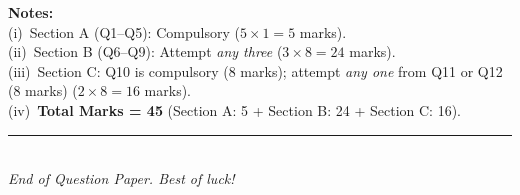 \documentclass[11pt,a4paper]{article}
\begin{document}
\smallskip
\noindent\footnotesize
\textbf{Notes:}\\
(i)~Section A (Q1--Q5): Compulsory ($5 \times 1 = 5$ marks).\\
(ii)~Section B (Q6--Q9): Attempt \emph{any three} ($3 \times 8 = 24$ marks).\\
(iii)~Section C: Q10 is compulsory (8 marks); attempt \emph{any one} from Q11 or Q12 (8 marks) ($2 \times 8 = 16$ marks).\\
(iv)~\textbf{Total Marks = 45} (Section A: 5 + Section B: 24 + Section C: 16).

\vfill

\begin{center}
\rule{0.4\linewidth}{0.4pt}\\
\textit{End of Question Paper. Best of luck!}
\end{center}
\end{document}
